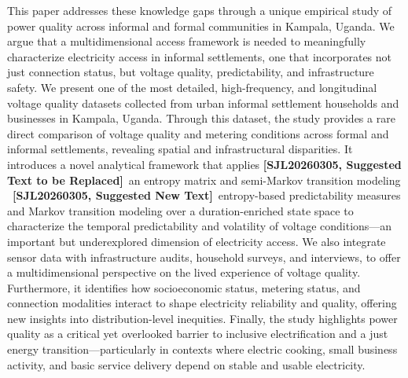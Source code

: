 \documentclass[review]{elsarticle}
\DeclareRobustCommand{\suggestreplacesjl}[2]{%
  {\color{sjlmutedred}\textbf{[SJL20260305, Suggested Text to be Replaced]}\ #1}%
  \ {\color{sjlmutedblue}\textbf{[SJL20260305, Suggested New Text]}\ #2}%
}
\begin{document}

This paper addresses these knowledge gaps through a unique empirical study of power quality across informal and formal communities in Kampala, Uganda. We argue that a multidimensional access framework is needed to meaningfully characterize electricity access in informal settlements, one that incorporates not just connection status, but voltage quality, predictability, and infrastructure safety. We present one of the most detailed, high-frequency, and longitudinal voltage quality datasets collected from urban informal settlement households and businesses in Kampala, Uganda. Through this dataset, the study provides a rare direct comparison of voltage quality and metering conditions across formal and informal settlements, revealing spatial and infrastructural disparities. It introduces a novel analytical framework that applies \suggestreplacesjl{an entropy matrix and semi-Markov transition modeling}{entropy-based predictability measures and Markov transition modeling over a duration-enriched state space} to characterize the temporal predictability and volatility of voltage conditions—an important but underexplored dimension of electricity access. We also integrate sensor data with infrastructure audits, household surveys, and interviews, to offer a multidimensional perspective on the lived experience of voltage quality. Furthermore, it identifies how socioeconomic status, metering status, and connection modalities interact to shape electricity reliability and quality, offering new insights into distribution-level inequities. Finally, the study highlights power quality as a critical yet overlooked barrier to inclusive electrification and a just energy transition—particularly in contexts where electric cooking, small business activity, and basic service delivery depend on stable and usable electricity.
\end{document}
